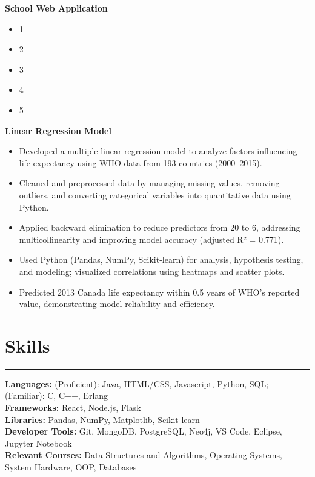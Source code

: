 \documentclass[10pt]{article}
\begin{document}
\textbf{School Web Application} 
\vspace{-4mm}
\begin{itemize}[left=0.15in, itemsep=0pt]
    \item 1
    \item 2
    \item 3
    \item 4
    \item 5
\end{itemize}

\textbf{Linear Regression Model} 
\vspace{-4mm}
\begin{itemize}[left=0.15in, itemsep=0pt]
    \item Developed a multiple linear regression model to analyze factors influencing life expectancy using WHO data from 193 countries (2000–2015).
    \item Cleaned and preprocessed data by managing missing values, removing outliers, and converting categorical variables into quantitative data using Python.
    \item Applied backward elimination to reduce predictors from 20 to 6, addressing multicollinearity and improving model accuracy (adjusted R² = 0.771).
    \item Used Python (Pandas, NumPy, Scikit-learn) for analysis, hypothesis testing, and modeling; visualized correlations using heatmaps and scatter plots.
    \item Predicted 2013 Canada life expectancy within 0.5 years of WHO’s reported value, demonstrating model reliability and efficiency.
\end{itemize}

\section*{Skills}
\vspace{-2mm}
\hrule
\vspace{0mm}
\textbf{Languages:} (Proficient): Java, HTML/CSS, Javascript, Python, SQL; (Familiar): C, C++, Erlang \\
\textbf{Frameworks:} React, Node.js, Flask  \\
\textbf{Libraries:} Pandas, NumPy, Matplotlib, Scikit-learn \\
\textbf{Developer Tools:} Git, MongoDB, PostgreSQL, Neo4j, VS Code, Eclipse, Jupyter Notebook \\
\textbf{Relevant Courses:} Data Structures and Algorithms, Operating Systems, System Hardware, OOP, Databases
\end{document}
